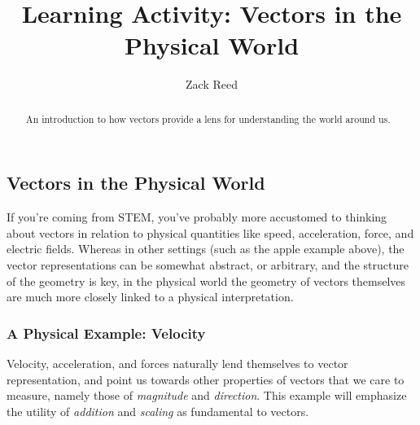 \documentclass{ximera}
\author{Zack Reed}
\title{Learning Activity: Vectors in the Physical World}
\begin{document}
\begin{abstract}
    An introduction to how vectors provide a lens for understanding the world around us.
\end{abstract}
\maketitle

\subsection{Vectors in the Physical World}

If you're coming from STEM, you've probably more accustomed to thinking about vectors in relation to physical quantities like speed, acceleration, force, and electric fields. Whereas in other settings (such as the apple example above), the vector representations can be somewhat abstract, or arbitrary, and the structure of the geometry is key, in the physical world the geometry of vectors themselves are much more closely linked to a physical interpretation.

\subsubsection{A Physical Example: Velocity}

Velocity, acceleration, and forces naturally lend themselves to vector representation, and point us towards other properties of vectors that we care to measure, namely those of \textit{magnitude} and \textit{direction}. This example will emphasize the utility of \textit{addition} and \textit{scaling} as fundamental to vectors.
\end{document}
